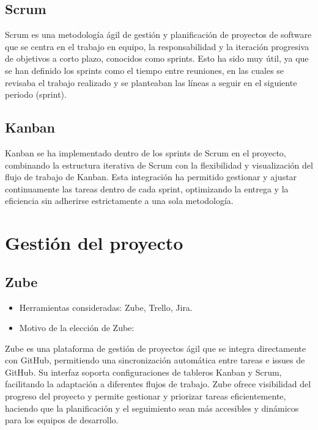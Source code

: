 \subsection{Scrum}\label{scrum}

Scrum es una metodología ágil de gestión y planificación de proyectos de software que se centra en el trabajo en equipo, la responsabilidad y la iteración progresiva de objetivos a corto plazo, conocidos como sprints. Esto ha sido muy útil, ya que se han definido los sprints como el tiempo entre reuniones, en las cuales se revisaba el trabajo realizado y se planteaban las líneas a seguir en el siguiente periodo (sprint).

\subsection{Kanban}\label{kanban}

Kanban se ha implementado dentro de los sprints de Scrum en el proyecto, combinando la estructura iterativa de Scrum con la flexibilidad y visualización del flujo de trabajo de Kanban. Esta integración ha permitido gestionar y ajustar continuamente las tareas dentro de cada sprint, optimizando la entrega y la eficiencia sin adherirse estrictamente a una sola metodología.

\section{Gestión del proyecto}\label{gestión-del-proyecto}

\subsection{Zube}\label{zube}

\begin{itemize}
    \item Herramientas consideradas: Zube, Trello, Jira.
    \item Motivo de la elección de Zube:
\end{itemize}

Zube es una plataforma de gestión de proyectos ágil que se integra directamente con GitHub, permitiendo una sincronización automática entre tareas e issues de GitHub. Su interfaz soporta configuraciones de tableros Kanban y Scrum, facilitando la adaptación a diferentes flujos de trabajo. Zube ofrece visibilidad del progreso del proyecto y permite gestionar y priorizar tareas eficientemente, haciendo que la planificación y el seguimiento sean más accesibles y dinámicos para los equipos de desarrollo.

